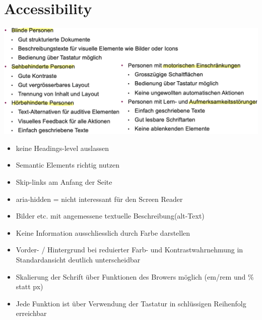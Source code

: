 
\section{Accessibility}
\begin{center}
    \includegraphics[scale=.2]{graphic/accessability/barrierefreien.png}
\end{center}
\vspace{-8pt}

\begin{itemize}
    \item keine Headings-level auslassen
    \item Semantic Elements richtig nutzen
    \item Skip-links am Anfang der Seite
    \item aria-hidden = nicht interessant für den Screen Reader
    \item Bilder etc. mit angemessene textuelle Beschreibung(alt-Text)
    \item Keine Information ausschliesslich durch Farbe darstellen
    \item Vorder- / Hintergrund bei reduierter Farb- und Kontrastwahrnehmung in Standardansicht deutlich unterscheidbar
    \item Skalierung der Schrift über Funktionen des Browers möglich (em/rem und \% statt px)
    \item Jede Funktion ist über Verwendung der Tastatur in schlüssigen Reihenfolg erreichbar
\end{itemize}



%


